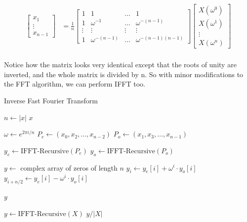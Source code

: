 \documentclass[12pt]{article}
\begin{document}
\begin{align*}
\begin{bmatrix}
    x_1\\
    \vdots\\
    x_{n-1}
\end{bmatrix}
    &=
    \frac{1}{n}
\begin{bmatrix}
    1      & 1      & \dots  & 1\\
    1      & \omega^{-1} & \dots  & \omega^{-(n-1)}\\
    \vdots & \vdots & \vdots & \vdots\\
    1      & \omega^{-(n-1)} & \dots & \omega^{-(n-1)(n-1)}
\end{bmatrix}
\begin{bmatrix}
    X(\omega^0)\\
    X(\omega^1)\\
    \vdots\\
    X(\omega^n)
\end{bmatrix}\\
\end{align*}

Notice how the matrix looks very identical except that the roots of unity are inverted, and the whole matrix is divided by n. So with minor modifications to the FFT algorithm, we can perform IFFT too.

\begin{algorithm}
\caption{Inverse Fast Fourier Transform}
\begin{algorithmic}[1]
    \State $n \gets |x|$ 
        \State \Return $x$
    \EndIf
    
    \State $\omega \gets e^{2\pi i / n}$ 
    \State $P_e \gets (x_0, x_2, \ldots, x_{n-2})$ 
    \State $P_o \gets (x_1, x_3, \ldots, x_{n-1})$ 
    
    \State $y_e \gets \text{IFFT-Recursive}(P_e)$ 
    \State $y_o \gets \text{IFFT-Recursive}(P_o)$ 
    
    \State $y \gets $ complex array of zeros of length $n$ 
        \State $y_i \gets y_e[i] + \omega^i \cdot y_o[i]$ 
        \State $y_{i+n/2} \gets y_e[i] - \omega^i \cdot y_o[i]$ 
    \EndFor
    
    \State \Return $y$
\EndProcedure

    \State $y \gets \text{IFFT-Recursive}(X)$
    \State \Return $y / |X|$ 
\EndProcedure
\end{algorithmic}
\end{algorithm}
\end{document}
